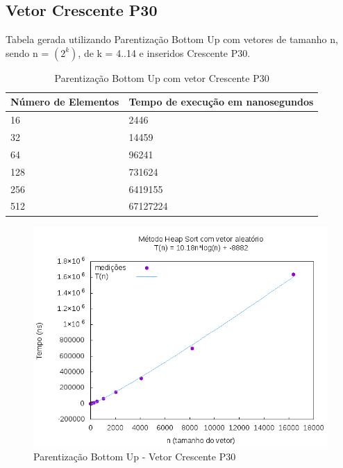 \documentclass[12pt,a4paper,twoside]{report}
\begin{document}
\subsection{Vetor Crescente P30}
Tabela gerada utilizando Parentização Bottom Up com vetores de tamanho n, sendo n = $(2^k)$, de k = 4..14 e inseridos Crescente P30.
\begin{table}[H]
\centering
\caption{Parentização Bottom Up com vetor Crescente P30}
\label{my-label}
\begin{tabular}{|l|l|}
\hline
\multicolumn{1}{|c|}{\textbf{Número de Elementos}} & \multicolumn{1}{c|}{\textbf{Tempo de execução em nanosegundos}} \\ \hline
16 & 2446 \\ \hline
32 & 14459 \\ \hline
64 & 96241 \\ \hline
128 & 731624 \\ \hline
256 & 6419155 \\ \hline
512 & 67127224 \\ \hline
\end{tabular}
\end{table}

\begin{figure}[H]
    \centering
    \includegraphics[width=0.7\linewidth]{graficos/HeapSort/vIntAleatorio/vIntAleatorio.png}
  \caption{Parentização Bottom Up - Vetor Crescente P30}
\end{figure}
\end{document}
